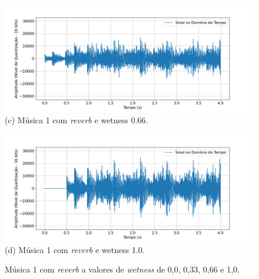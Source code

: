 \begin{figure}[htpb]
    \begin{minipage}[b]{0.7\textwidth}
        \centering
        \includegraphics[width=\textwidth]{figuras/fig95.png}
        \vspace{0.3cm} %
        (c) Música 1 com \textit{reverb} e wetness 0.66.
    \end{minipage}
    \hspace{0.5cm} %

    \begin{minipage}[b]{0.7\textwidth}
        \centering
        \includegraphics[width=\textwidth]{figuras/fig96.png}
        \vspace{0.3cm} %
        (d) Música 1 com \textit{reverb} e wetness 1.0.
    \end{minipage}

    \caption{Música 1 com \textit{reverb} a valores de \textit{wetness} de 0,0, 0,33, 0,66 e 1,0.}
    \label{fig93}
\end{figure}





